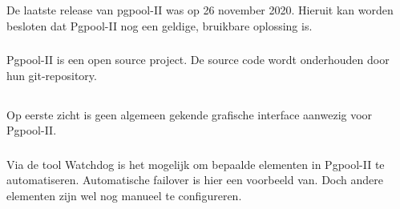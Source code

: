 De laatste release van pgpool-II was op 26 november 2020. Hieruit kan worden besloten dat Pgpool-II nog een geldige, bruikbare oplossing is.

\subsubsection{}
\label{subsubsec:Open source}

Pgpool-II is een open source project. De source code wordt onderhouden door hun git-repository.

\subsection{}
\label{subsec:Could have}


\subsubsection{}
\label{subsubsec:Grafische interface}

Op eerste zicht is geen algemeen gekende grafische interface aanwezig voor Pgpool-II.

\subsubsection{}
\label{subsubsec:Beperkte manuele interventie}

Via de tool Watchdog is het mogelijk om bepaalde elementen in Pgpool-II te automatiseren. Automatische failover is hier een voorbeeld van. Doch andere elementen zijn wel nog manueel te configureren.
